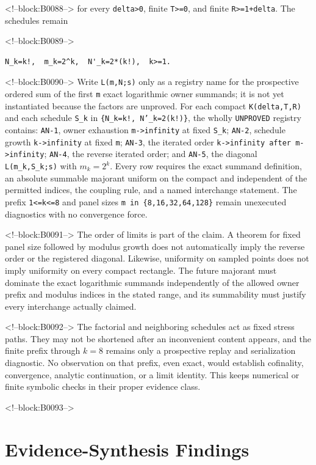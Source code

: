 \documentclass[11pt]{article}
\begin{document}
<!--block:B0088-->
for every \texttt{delta\textgreater{}0}, finite
\texttt{T\textgreater{}=0}, and finite \texttt{R\textgreater{}=1+delta}.
The schedules remain

<!--block:B0089-->
\begin{verbatim}
N_k=k!,  m_k=2^k,  N'_k=2*(k!),  k>=1.
\end{verbatim}

<!--block:B0090-->
Write \texttt{L(m,N;s)} only as a registry name for the prospective
ordered sum of the first \texttt{m} exact logarithmic owner summands; it is not
yet instantiated because the factors are unproved. For each compact
\texttt{K(delta,T,R)} and each schedule \texttt{S\_k} in
\texttt{\{N\_k=k!, N'\_k=2(k!)\}}, the wholly \texttt{UNPROVED} registry
contains: \texttt{AN-1}, owner exhaustion \texttt{m->infinity} at fixed
\texttt{S\_k}; \texttt{AN-2}, schedule growth \texttt{k->infinity} at fixed
\texttt{m}; \texttt{AN-3}, the iterated order
\texttt{k->infinity after m->infinity}; \texttt{AN-4}, the reverse iterated
order; and \texttt{AN-5}, the diagonal
\texttt{L(m\_k,S\_k;s)} with
\(m_k=2^k\). Every row requires the exact summand definition, an absolute
summable majorant uniform on the compact and independent of the permitted
indices, the coupling rule, and a named interchange statement. The prefix
\texttt{1<=k<=8} and panel sizes \texttt{m in \{8,16,32,64,128\}} remain
unexecuted diagnostics with no convergence force.

<!--block:B0091-->
The order of limits is part of the claim. A theorem for fixed panel size
followed by modulus growth does not automatically imply the reverse
order or the registered diagonal. Likewise, uniformity on sampled
points does not imply uniformity on every compact rectangle. The future
majorant must dominate the exact logarithmic summands independently of
the allowed owner prefix and modulus indices in the stated range, and
its summability must justify every interchange actually claimed.

<!--block:B0092-->
The factorial and neighboring schedules act as fixed stress paths. They
may not be shortened after an inconvenient content appears, and the
finite prefix through $k=8$ remains only a prospective replay and
serialization diagnostic. No observation on that prefix, even exact,
would establish cofinality, convergence, analytic continuation, or a
limit identity. This keeps numerical or finite symbolic checks in their
proper evidence class.

<!--block:B0093-->
\hypertarget{5-evidence-synthesis-findings}{%
\section{Evidence-Synthesis
Findings}\label{5-evidence-synthesis-findings}}
\end{document}

